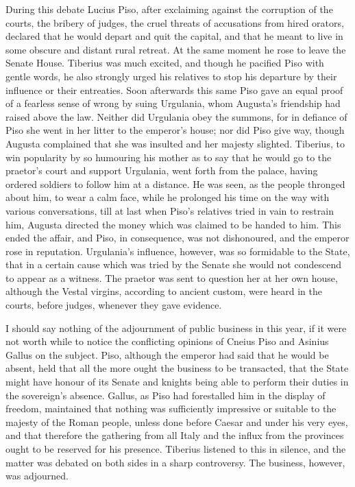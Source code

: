 
During this debate Lucius Piso, after exclaiming against the corruption of the courts, the bribery of judges, the cruel threats of accusations from hired orators, declared that he would depart and quit the capital, and that he meant to live in some obscure and distant rural retreat. At the same moment he rose to leave the Senate House. Tiberius was much excited, and though he pacified Piso with gentle words, he also strongly urged his relatives to stop his departure by their influence or their entreaties. Soon afterwards this same Piso gave an equal proof of a fearless sense of wrong by suing Urgulania, whom Augusta's friendship had raised above the law. Neither did Urgulania obey the summons, for in defiance of Piso she went in her litter to the emperor's house; nor did Piso give way, though Augusta complained that she was insulted and her majesty slighted. Tiberius, to win popularity by so humouring his mother as to say that he would go to the praetor's court and support Urgulania, went forth from the palace, having ordered soldiers to follow him at a distance. He was seen, as the people thronged about him, to wear a calm face, while he prolonged his time on the way with various conversations, till at last when Piso's relatives tried in vain to restrain him, Augusta directed the money which was claimed to be handed to him. This ended the affair, and Piso, in consequence, was not dishonoured, and the emperor rose in reputation. Urgulania's influence, however, was so formidable to the State, that in a certain cause which was tried by the Senate she would not condescend to appear as a witness. The praetor was sent to question her at her own house, although the Vestal virgins, according to ancient custom, were heard in the courts, before judges, whenever they gave evidence.


I should say nothing of the adjournment of public business in this year, if it were not worth while to notice the conflicting opinions of Cneius Piso and Asinius Gallus on the subject. Piso, although the emperor had said that he would be absent, held that all the more ought the business to be transacted, that the State might have honour of its Senate and knights being able to perform their duties in the sovereign's absence. Gallus, as Piso had forestalled him in the display of freedom, maintained that nothing was sufficiently impressive or suitable to the majesty of the Roman people, unless done before Caesar and under his very eyes, and that therefore the gathering from all Italy and the influx from the provinces ought to be reserved for his presence. Tiberius listened to this in silence, and the matter was debated on both sides in a sharp controversy. The business, however, was adjourned.

